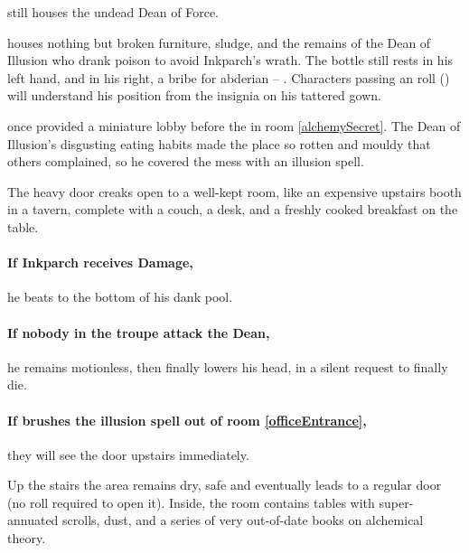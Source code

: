 \setcounter{enumi}{\value{list}}
\begin{list}{Room\space{}.\space}{}
  \item
  still houses the undead Dean of Force.
  \label{deanRoom}
  \item
  houses nothing but broken furniture, sludge, and the remains of the Dean of Illusion who drank poison to avoid Inkparch's wrath.
  The bottle still rests in his left hand, and in his right, a bribe for \gls{abderian} -- \lootBig.
  Characters passing an  roll (\tn[13]) will understand his position from the insignia on his tattered gown.
  \label{deadIllusionist}
  \item
  once provided a miniature lobby before the  in room \ref{alchemySecret}.
  The Dean of Illusion's disgusting eating habits made the place so rotten and mouldy that others complained, so he covered the mess with an illusion \gls{spell}.
  \label{officeEntrance}
  \begin{boxtext}
    The heavy door creaks open to a well-kept room, like an expensive upstairs booth in a tavern, complete with a couch, a desk, and a freshly cooked breakfast on the table.
  \end{boxtext}
\end{list}

\paragraph{If Inkparch receives Damage,}
he beats  to the bottom of his dank pool.

\paragraph{If nobody in the troupe attack the Dean,}
he remains motionless, then finally lowers his head, in a silent request to finally die.

\paragraph{If  brushes the illusion \gls{spell} out of room \ref{officeEntrance},}
they will see the door upstairs immediately.


Up the stairs the area remains dry, safe and eventually leads to a regular door (no roll required to open it).
Inside, the room contains tables with super-annuated scrolls, dust, and a series of very out-of-date books on alchemical theory.

